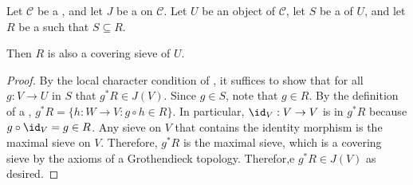 \begin{proposition} \label{proposition:sieve_containing_covering_sieve_is_covering_with_respect_to_grothendieck_topology}
    Let $\mathcal{C}$ be a , and let $J$ be a  on $\mathcal{C}$.
    Let $U$ be an object of $\mathcal{C}$, let $S$ be a  of $U$, and let $R$ be a  such that $S \subseteq R$.

    Then $R$ is also a covering sieve of $U$.
\end{proposition}

\begin{proof}
    By the local character condition of , it suffices to show that for all $g : V \to U$ in $S$ that $g^* R \in J(V)$. Since $g \in S$, note that $g \in R$. By the definition of a , $g^* R = \{h: W \to V : g \circ h \in R\}$. In particular, $\id_V: V \to V$ is in $g^* R$ because $g \circ \id_V = g \in R$. Any sieve on $V$ that contains the identity morphism is the maximal sieve on $V$. Therefore, $g^* R$ is the maximal sieve, which is a covering sieve by the axioms of a Grothendieck topology. Therefor,e $g^* R \in J(V)$ as desired. 
\end{proof}
